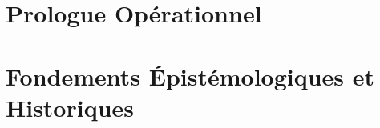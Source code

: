 \documentclass[12pt, twoside, openright, a4paper]{book}
\begin{document}
\frontmatter

    
    \cleardoublepage

    
    \cleardoublepage

    
    \cleardoublepage
    
    \cleardoublepage

    \tableofcontents
    \cleardoublepage

    \listoffigures
    \listoftables
    \cleardoublepage

\mainmatter

    \part*{Prologue Opérationnel}
    \label{part:prologue}

        \setcounter{chapter}{-1}

        
    
    \part{Fondements Épistémologiques et Historiques}
    \label{part:fondements}

        
       
        
      
\end{document}
